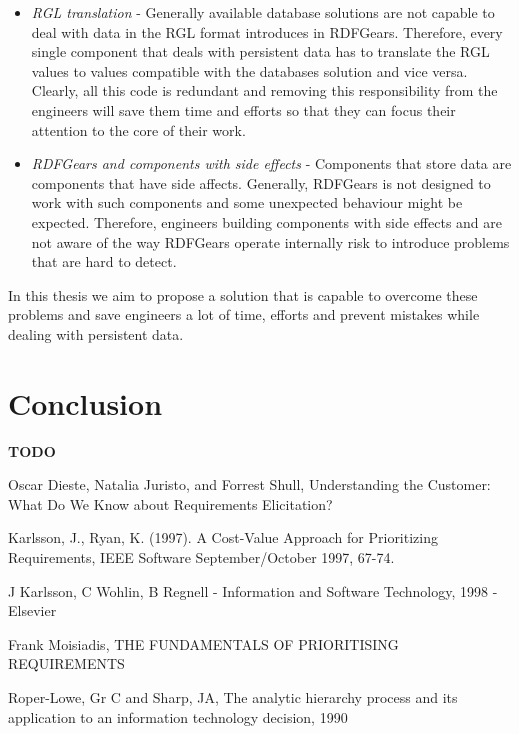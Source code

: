 \begin{itemize}
	\item \textit{RGL translation} - Generally available database solutions are not capable to deal with data in the RGL format introduces in RDFGears. Therefore, every single component that deals with persistent data has to translate the RGL values to values compatible with the databases solution and vice versa. Clearly, all this code is redundant and removing this responsibility from the engineers will save them time and efforts so that they can focus their attention to the core of their work.
	
	\item \textit{RDFGears and components with side effects} - Components that store data are components that have side affects. Generally, RDFGears is not designed to work with such components and some unexpected behaviour might be expected. Therefore, engineers building components with side effects and are not aware of the way RDFGears operate internally risk to introduce problems that are hard to detect.
	
\end{itemize}

In this thesis we aim to propose a solution that is capable to overcome these problems and save engineers a lot of time, efforts and prevent mistakes while dealing with persistent data.

\section{Conclusion}

\textbf{TODO}

\begin{thebibliography}{99}

Oscar Dieste, Natalia Juristo, and Forrest Shull, Understanding the Customer: What Do We Know about Requirements Elicitation?

Karlsson, J., Ryan, K. (1997). A Cost-Value Approach for Prioritizing Requirements, IEEE Software September/October 1997, 67-74.

J Karlsson, C Wohlin, B Regnell - Information and Software Technology, 1998 - Elsevier

Frank Moisiadis, THE FUNDAMENTALS OF PRIORITISING REQUIREMENTS

 Roper-Lowe, Gr C and Sharp, JA, The analytic hierarchy process and its application to an information technology decision, 1990

\end{thebibliography}
